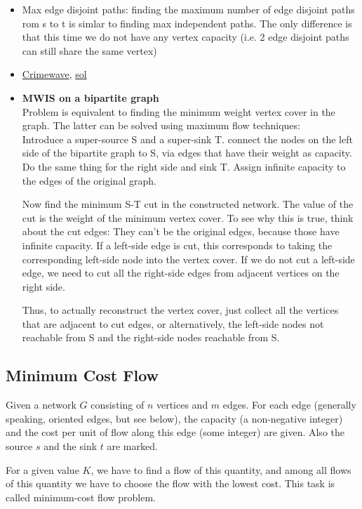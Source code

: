 \documentclass[8pt, a4paper, oneside, twocolumn]{extarticle}
\begin{document}
\begin{itemize}[leftmargin=*]
    \item Max edge disjoint paths: finding the maximum number of edge disjoint paths rom s to t is simlar to finding max independent paths. The only difference is that this time we do not have any vertex capacity (i.e. 2 edge disjoint paths can still share the same vertex)
    \item \href{https://uva.onlinejudge.org/external/5/563.pdf}{Crimewave}, \href{https://gist.github.com/sourabh2311/d9125c7f5149f80b267514b66ec65d3b}{sol} 
    \item \textbf{MWIS on a bipartite graph}
    \\Problem is equivalent to finding the minimum weight vertex cover in the graph. The latter can be solved using maximum flow techniques:
    \\Introduce a super-source S and a super-sink T. connect the nodes on the left side of the bipartite graph to S, via edges that have their weight as capacity. Do the same thing for the right side and sink T. Assign infinite capacity to the edges of the original graph.

    Now find the minimum S-T cut in the constructed network. The value of the cut is the weight of the minimum vertex cover. To see why this is true, think about the cut edges: They can't be the original edges, because those have infinite capacity. If a left-side edge is cut, this corresponds to taking the corresponding left-side node into the vertex cover. If we do not cut a left-side edge, we need to cut all the right-side edges from adjacent vertices on the right side.

    Thus, to actually reconstruct the vertex cover, just collect all the vertices that are adjacent to cut edges, or alternatively, the left-side nodes not reachable from S and the right-side nodes reachable from S.
    

\end{itemize}
\subsection{Minimum Cost Flow}
Given a network $G$ consisting of $n$ vertices and $m$ edges. For each edge (generally speaking, oriented edges, but see below), the capacity (a non-negative integer) and the cost per unit of flow along this edge (some integer) are given. Also the source $s$ and the sink $t$ are marked.

For a given value $K$, we have to find a flow of this quantity, and among all flows of this quantity we have to choose the flow with the lowest cost. This task is called minimum-cost flow problem.
\end{document}
